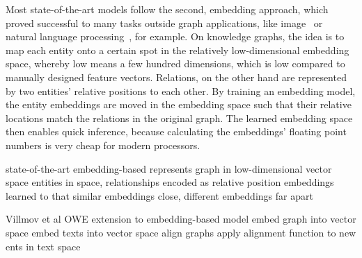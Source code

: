 Most state-of-the-art models follow the second, embedding approach, which proved successful to many tasks outside graph applications, like image~\cite{} or natural language processing~\cite{}, for example. On knowledge graphs, the idea is to map each entity onto a certain spot in the relatively low-dimensional embedding space, whereby low means a few hundred dimensions, which is low compared to manually designed feature vectors. Relations, on the other hand are represented by two entities' relative positions to each other. By training an embedding model, the entity embeddings are moved in the embedding space such that their relative locations match the relations in the original graph. The learned embedding space then enables quick inference, because calculating the embeddings' floating point numbers is very cheap for modern processors.


state-of-the-art \cite{Wang2017KnowledgeGE}
embedding-based represents graph in low-dimensional vector space
entities in space, relationships encoded as relative position
embeddings learned to that similar embeddings close, different embeddings far apart


Villmov et al OWE \cite{Shah2019AnOE}
extension to embedding-based model
embed graph into vector space
embed texts into vector space
align graphs
apply alignment function to new ents in text space

